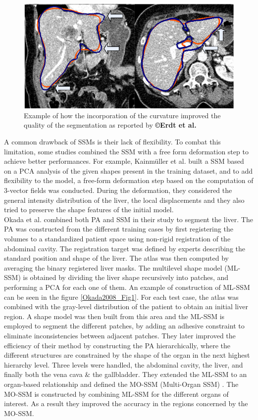\begin{figure}[th!]
	\centering
	\includegraphics[width=0.4\linewidth]{images/Erdt2010_Fig3}
	\caption{Example of how the incorporation of the curvature improved the quality of the segmentation as reported by \textbf{©Erdt et al. \cite{Erdt2010}}}
	\label{Erdt2010_Fig3}
\end{figure}


A common drawback of SSMs is their lack of flexibility. To combat this
limitation, some studies combined the SSM with a free form deformation
step to achieve better performances. For example, Kainmüller et al. \cite{Kainmueller2007} built a SSM based on a PCA analysis of the given shapes
present in the training dataset, and to add flexibility to the model, a
free-form deformation step based on the computation of 3-vector fields
was conducted. During the deformation, they considered the general
intensity distribution of the liver, the local displacements and they
also tried to preserve the shape features of the initial model.\\
Okada et al. \cite{Okada2008} combined both PA and SSM in their study to segment the liver. The PA was
constructed from the different training cases by first registering the
volumes to a standardized patient space using non-rigid registration of
the abdominal cavity. The registration target was defined by experts
describing the standard position and shape of the liver. The atlas was
then computed by averaging the binary registered liver masks. The
multilevel shape model (ML-SSM) is obtained by dividing the liver shape
recursively into patches, and performing a PCA for each one of them. An
example of construction of ML-SSM can be seen in the figure \ref{Okada2008_Fig1}.
For each test case, the atlas was combined with the gray-level
distribution of the patient to obtain an initial liver region. A shape
model was then built from this area and the ML-SSM is employed to
segment the different patches, by adding an adhesive constraint to
eliminate inconsistencies between adjacent patches. They later improved
the efficiency of their method by constructing the PA hierarchically,
where the different structures are constrained by the shape of the organ
in the next highest hierarchy level. Three levels were handled, the
abdominal cavity, the liver, and finally both the vena cava \& the
gallbladder. They extended the ML-SSM to an organ-based relationship and
defined the MO-SSM (Multi-Organ SSM) \cite{Okada2008}. The MO-SSM is constructed by combining ML-SSM for the
different organs of interest. As a result they improved the accuracy in
the regions concerned by the MO-SSM.


